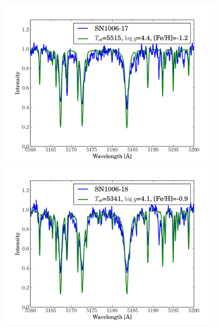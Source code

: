 \begin{figure}[tb]
   \label{fig:sn1006_candfit}
\end{figure}\begin{figure}[tb] %
   \centering
\includegraphics[width=1.1\textwidth, trim=0 0mm 0 10mm, clip]{chapter_sn1006/plots/gold_spectra/sn1006_17.pdf}
\includegraphics[width=1.1\textwidth, trim=0 0mm 0 10mm, clip]{chapter_sn1006/plots/gold_spectra/sn1006_18.pdf}


\end{figure}
